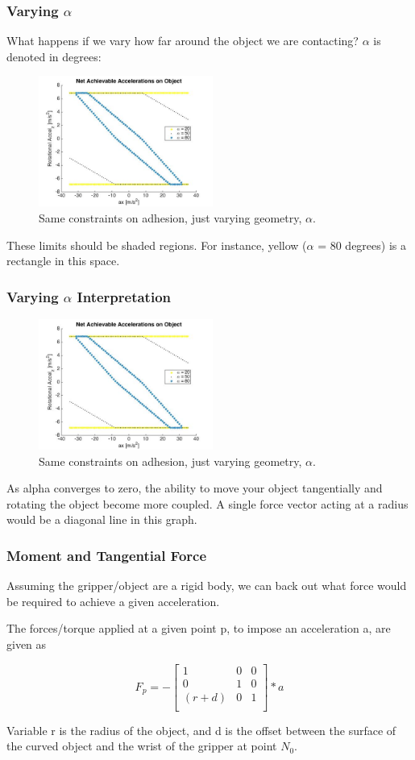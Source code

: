 \documentclass{beamer}
\begin{document}
\frame
{
\frametitle{ Varying $\alpha$}

What happens if we vary how far around the object we are contacting? $\alpha$ is denoted in degrees: 

\begin{figure}[htb]
	\centering
	\includegraphics[width=2.25in]{images/VaryingAlpha.jpg}
	\caption{Same constraints on adhesion, just varying geometry, $\alpha$.}
\end{figure}
	These limits should be shaded regions. For instance, yellow ($\alpha$ = 80 degrees) is a rectangle in this space. 
}

\frame
{
\frametitle{ Varying $\alpha$ Interpretation}


\begin{figure}[htb]
	\centering
	\includegraphics[width=2.25in]{images/VaryingAlpha.jpg}
	\caption{Same constraints on adhesion, just varying geometry, $\alpha$.}
\end{figure}
	
	As alpha converges to zero, the ability to move your object tangentially and rotating the object become more coupled. A single force vector acting at a radius would be a diagonal line in this graph. 
}


\frame
{
\frametitle{ Moment and Tangential Force  }

Assuming the gripper/object are a rigid body, we can back out what force would be required to achieve a given acceleration.

The forces/torque applied at a given point p, to impose an acceleration a, are given as

\begin{equation}
F_{p} = 
  -\begin{bmatrix}
    1 & 0 & 0 \\
    0 & 1 & 0 \\
    (r+d) & 0 & 1 \\
  \end{bmatrix}
* a
\end{equation}

Variable r is the radius of the object, and d is the offset between the surface of the curved object and the wrist of the gripper at point $N_{0}$. 
	
}
\end{document}
